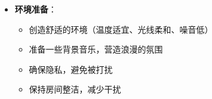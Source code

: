 \documentclass[12pt,UTF8]{ctexbook}
\begin{document}
\begin{itemize}
\begin{itemize}
		\begin{itemize}
			\item 准备避孕套，预防性传播疾病
			\item 可以准备一些情趣用品，增加性体验的多样性
		\end{itemize}
	\end{itemize}
	\item \textbf{环境准备}：
	\begin{itemize}
		\item 创造舒适的环境（温度适宜、光线柔和、噪音低）
		\item 准备一些背景音乐，营造浪漫的氛围
		\item 确保隐私，避免被打扰
		\item 保持房间整洁，减少干扰
	\end{itemize}
\end{itemize}
\end{document}
